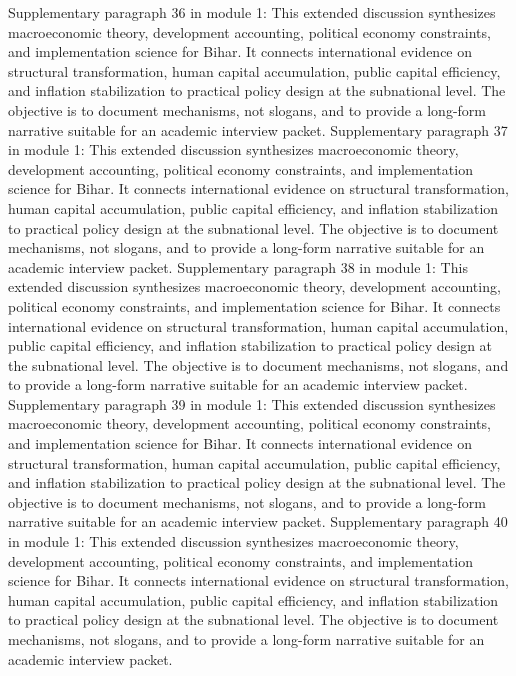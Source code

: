\documentclass[preprint,12pt]{elsarticle}
\begin{document}
Supplementary paragraph 36 in module 1: This extended discussion synthesizes macroeconomic theory, development accounting, political economy constraints, and implementation science for Bihar. It connects international evidence on structural transformation, human capital accumulation, public capital efficiency, and inflation stabilization to practical policy design at the subnational level. The objective is to document mechanisms, not slogans, and to provide a long-form narrative suitable for an academic interview packet.
Supplementary paragraph 37 in module 1: This extended discussion synthesizes macroeconomic theory, development accounting, political economy constraints, and implementation science for Bihar. It connects international evidence on structural transformation, human capital accumulation, public capital efficiency, and inflation stabilization to practical policy design at the subnational level. The objective is to document mechanisms, not slogans, and to provide a long-form narrative suitable for an academic interview packet.
Supplementary paragraph 38 in module 1: This extended discussion synthesizes macroeconomic theory, development accounting, political economy constraints, and implementation science for Bihar. It connects international evidence on structural transformation, human capital accumulation, public capital efficiency, and inflation stabilization to practical policy design at the subnational level. The objective is to document mechanisms, not slogans, and to provide a long-form narrative suitable for an academic interview packet.
Supplementary paragraph 39 in module 1: This extended discussion synthesizes macroeconomic theory, development accounting, political economy constraints, and implementation science for Bihar. It connects international evidence on structural transformation, human capital accumulation, public capital efficiency, and inflation stabilization to practical policy design at the subnational level. The objective is to document mechanisms, not slogans, and to provide a long-form narrative suitable for an academic interview packet.
Supplementary paragraph 40 in module 1: This extended discussion synthesizes macroeconomic theory, development accounting, political economy constraints, and implementation science for Bihar. It connects international evidence on structural transformation, human capital accumulation, public capital efficiency, and inflation stabilization to practical policy design at the subnational level. The objective is to document mechanisms, not slogans, and to provide a long-form narrative suitable for an academic interview packet.
\end{document}
